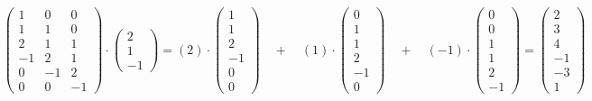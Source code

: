 \begin{align}
\begin{pmatrix}
1 & 0 & 0 \\
1 & 1 & 0 \\
2 & 1 & 1 \\
-1 & 2 & 1 \\
0 & -1 & 2 \\
0 & 0 & -1
\end{pmatrix}
\cdot
\begin{pmatrix}
2\\1\\-1
\end{pmatrix}
=
(2) \cdot
\begin{pmatrix}
1\\
1\\
2\\
-1\\
0 \\
0
\end{pmatrix}
\quad+\quad
(1) \cdot
\begin{pmatrix}
0\\
1\\
1\\
2\\
-1\\
0
\end{pmatrix}
\quad+\quad
(-1) \cdot
\begin{pmatrix}
0 \\
0 \\
1 \\
1 \\
2 \\
-1
\end{pmatrix}
=
\begin{pmatrix}
2 \\
3 \\
4 \\
-1 \\
-3 \\
1
\end{pmatrix}
\end{align}

